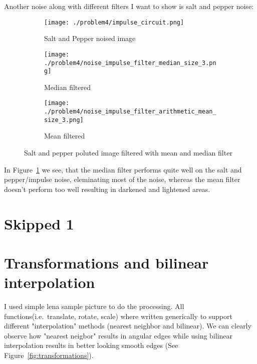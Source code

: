 \documentclass[a4paper]{scrartcl}
\begin{document}
Another noise along with different filters I want to show is salt and pepper noise:
\begin{figure}[h]
  \centering
  \begin{subfigure}[t]{0.4\textwidth}
    \texttt{[image: ./problem4/impulse\_circuit.png]}
    \caption{Salt and Pepper noised image}
  \end{subfigure}
  \begin{subfigure}[t]{0.4\textwidth}
    \texttt{[image: ./problem4/noise\_impulse\_filter\_median\_size\_3.png]}
    \caption{Median filtered}
  \end{subfigure}
  \begin{subfigure}[t]{0.4\textwidth}
    \texttt{[image: ./problem4/noise\_impulse\_filter\_arithmetic\_mean\_size\_3.png]}
    \caption{Mean filtered}
  \end{subfigure}
  \caption{Salt and pepper poluted image filtered with mean and median filter}
  \label{fig:circuitsaltpepper}
\end{figure}

In Figure~\ref{fig:circuitsaltpepper} we see, that the median filter performs quite well on the salt and pepper/impulse noise, eleminating most of the noise, whereas the mean filter doesn't perform too well resulting in darkened and lightened areas.



\section{Skipped 1}

\section{Transformations and bilinear interpolation}

I used simple lena sample picture to do the processing. All functions(i.e.\ translate, rotate, scale) where written generically to support different "interpolation" methods (nearest neighbor and bilinear). We can clearly observe how "nearest neigbor" results in angular edges while using bilinear interpolation results in better looking smooth edges (See Figure~\ref{fig:transformations}).
\end{document}
